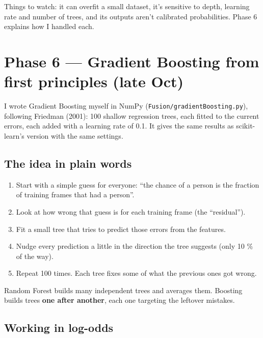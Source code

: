 \documentclass[11pt,a4paper]{article}
\providecommand{\tightlist}{\setlength{\itemsep}{0pt}\setlength{\parskip}{0pt}}
\begin{document}
Things to watch: it can
overfit a small dataset, it's
sensitive to depth, learning
rate and number of trees, and
its outputs aren't calibrated
probabilities. Phase 6
explains how I handled each.

\hypertarget{phase-6-gradient-boosting-from-first-principles-late-oct}{%
\section{Phase 6 --- Gradient
Boosting from first principles
(late
Oct)}\label{phase-6-gradient-boosting-from-first-principles-late-oct}}

I wrote Gradient Boosting
myself in NumPy
(\texttt{Fusion/gradientBoosting.py}),
following Friedman (2001): 100
shallow regression trees, each
fitted to the current errors,
each added with a learning
rate of 0.1. It gives the same
results as scikit-learn's
version with the same
settings.

\hypertarget{the-idea-in-plain-words}{%
\subsection{The idea in plain
words}\label{the-idea-in-plain-words}}

\begin{enumerate}
\def\labelenumi{\arabic{enumi}.}
\tightlist
\item
  Start with a simple guess
  for everyone: ``the chance
  of a person is the fraction
  of training frames that had
  a person''.
\item
  Look at how wrong that guess
  is for each training frame
  (the ``residual'').
\item
  Fit a small tree that tries
  to predict those errors from
  the features.
\item
  Nudge every prediction a
  little in the direction the
  tree suggests (only 10 \% of
  the way).
\item
  Repeat 100 times. Each tree
  fixes some of what the
  previous ones got wrong.
\end{enumerate}

Random Forest builds many
independent trees and averages
them. Boosting builds trees
\textbf{one after another},
each one targeting the
leftover mistakes.

\hypertarget{working-in-log-odds}{%
\subsection{Working in
log-odds}\label{working-in-log-odds}}
\end{document}
